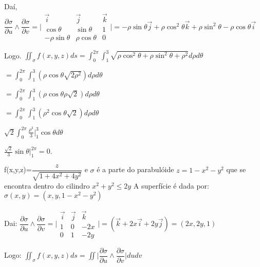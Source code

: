 \documentclass[11pt,a4paper]{article}
\newcommand{\integral}{\displaystyle\int}
\begin{document}
\begin{enumerate}
{{{	Daí,\newline
		$\dfrac{\partial \sigma}{\partial u} \wedge\dfrac{\partial \sigma}{\partial v}= 
	\bigg|\begin{array}{ccc}
	     \Vec{i}  &  \vec{j}  &  \Vec{k}\\
	     \cos{\theta}         &  \sin{\theta}        &  1\\
	     -\rho\sin\theta      &  \rho\cos\theta        &  0
	\end{array} \bigg| 
	=-\rho\sin\theta\vec{j}+\rho\cos^{2}\theta\vec{k} +\rho\sin^{2}\theta -\rho\cos\theta\vec{i}  $ \newline
	
	Logo.\newline
	$\iint_\sigma f(x,y,z)ds=\integral_0^{2\pi} \integral_1^3 \sqrt{\rho\cos^{2}\theta +\rho\sin^{2}\theta +\rho^{2}} d\rho d\theta $
	
	$=\integral_0^{2\pi} \integral_1^3 (\rho\cos\theta \sqrt{2\rho^{2}}) d\rho d\theta$
	
	$=\integral_0^{2\pi} \integral_1^3 (\rho\cos\theta \rho\sqrt{2}) d\rho d\theta$
	
	$=\integral_0^{2\pi} \integral_1^3 (\rho^{2}\cos\theta \sqrt{2}) d\rho d\theta$
	
	$\sqrt{2}\integral_0^{2\pi} \frac{\rho^{3}}{3}|_1^3 \cos \theta d\theta $
	
	$\frac{\sqrt{2}}{3} \sin\theta|_1^{2\pi} =0.$\newline
	
	
	\item f(x,y,z)=$\dfrac{z}{\sqrt{1+4x^{2}+4y^{2}}}$ e $\sigma$ é a  parte do parabulóide $z=1-x^{2}-y^{2}$ que se encontra dentro do cilindro $x^{2}+y^{2}\leq 2y$\newline  
	A superfície é dada por:\newline
	$\sigma(x,y)=(x,y,1-x^{2}-y^{2})$\newline
	
	Dai: \newline
	$\dfrac{\partial \sigma}{\partial u} \wedge\dfrac{\partial \sigma}{\partial v}= 
	\bigg|\begin{array}{crl}
	     \Vec{i}  &  \vec{j}  &  \Vec{k}\\
	     1        &  0        &  -2x\\
	     0        &  1        &  -2y
	\end{array} \bigg| 
	=(\vec{k}+2x\vec{i}+2y\vec{j})=(2x,2y,1) $ \newline
	
	Logo: \newline
	$\iint_\sigma f(x,y,z)ds=\iint 
	\bigg|\dfrac{\partial \sigma}{\partial u} \wedge\dfrac{\partial \sigma}{\partial v}\bigg| dudv$ 
	
}}}
\end{enumerate}
\end{document}
